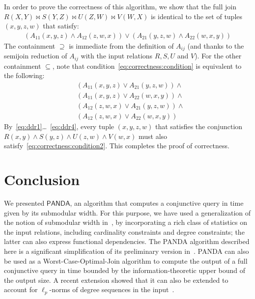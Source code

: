 \documentclass{theoretics}
\newcommand{\panda}{\textsf{PANDA}\xspace}
\begin{document}
    In order to prove the correctness of this algorithm, we show that the full join $R(X, Y)\Join S(Y, Z)\Join U(Z, W)\Join V(W, X)$ is identical to the set of tuples $(x, y, z, w)$ that satisfy:
    \begin{align}
        (A_{11}(x, y, z) \wedge A_{12}(z, w, x)) \vee
        (A_{21}(y, z, w) \wedge A_{22}(w, x, y))
        \label{eq:correctness:condition}
    \end{align}
    The containment $\supseteq$ is immediate from the definition of $A_{ij}$ (and thanks to the semijoin reduction of $A_{ij}$ with the input relations $R, S, U$ and $V$). For the other containment $\subseteq$, note that condition~\eqref{eq:correctness:condition} is equivalent to the following:
    \begin{align}
        \label{eq:correctness:condition2}
        &(A_{11}(x, y, z) \vee A_{21}(y, z, w)) \wedge\\
        &(A_{11}(x, y, z) \vee A_{22}(w, x, y)) \wedge\nonumber\\
        &(A_{12}(z, w, x) \vee A_{21}(y, z, w)) \wedge\nonumber\\
        &(A_{12}(z, w, x) \vee A_{22}(w, x, y)) \nonumber
    \end{align}
    By~\eqref{eq:ddr1}\ldots~\eqref{eq:ddr4}, every tuple $(x, y, z, w)$ that satisfies the conjunction $R(x, y)\wedge S(y, z)\wedge U(z, w)\wedge V(w, x)$ must also satisfy~\eqref{eq:correctness:condition2}. This completes the proof of correctness.

\section{Conclusion}
\label{sec:conclusion}

We presented $\panda$, an algorithm that computes a conjunctive query in time given by its
submodular width.  For this purpose, we have used a generalization of the notion of
submodular width in~\cite{DBLP:journals/jacm/Marx13}, by incorporating a rich class of
statistics on the input relations, including cardinality constraints and degree constraints;
the latter can also express functional dependencies. The \panda algorithm described here is
a significant simplification of its preliminary version in~\cite{DBLP:conf/pods/Khamis0S17}.
\panda can also be used as a Worst-Case-Optimal-Join algorithm to compute the output of a
full conjunctive query in time bounded by the information-theoretic upper bound of the
output size. A recent extension showed that it can also be extended to account for
$\ell_p$-norms of degree sequences in the input~\cite{10.1145/3651597}.
\end{document}
